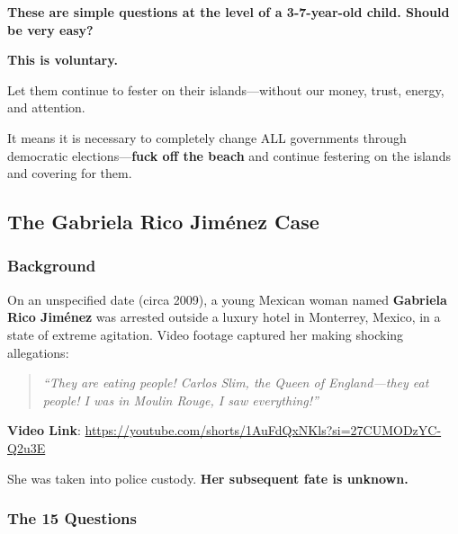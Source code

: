 \documentclass[11pt,a4paper]{article}
\theoremstyle{definition}
\theoremstyle{remark}
\begin{document}
\textbf{These are simple questions at the level of a 3-7-year-old child. Should be very easy?}

\textbf{This is voluntary.}

\begin{center}
\end{center}

Let them continue to fester on their islands—without our money, trust, energy, and attention.

It means it is necessary to completely change ALL governments through democratic elections—\textbf{fuck off the beach} and continue festering on the islands and covering for them.

\subsection{The Gabriela Rico Jiménez Case}
\label{subsec:jimenez}

\subsubsection{Background}

On an unspecified date (circa 2009), a young Mexican woman named \textbf{Gabriela Rico Jiménez} was arrested outside a luxury hotel in Monterrey, Mexico, in a state of extreme agitation. Video footage captured her making shocking allegations:

\begin{quote}
\textit{``They are eating people! Carlos Slim, the Queen of England—they eat people! I was in Moulin Rouge, I saw everything!''}
\end{quote}

\textbf{Video Link}: \url{https://youtube.com/shorts/1AuFdQxNKls?si=27CUMODzYC-Q2u3E}

She was taken into police custody. \textbf{Her subsequent fate is unknown.}

\subsubsection{The 15 Questions}
\end{document}
